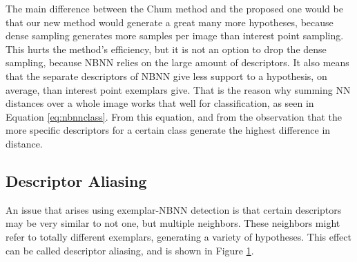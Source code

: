 The main difference between the Chum method and the proposed one would be that our new method would generate a great many more hypotheses, because dense sampling generates more samples per image than interest point sampling. This hurts the method's efficiency, but it is not an option to drop the dense sampling, because NBNN relies on the large amount of descriptors. It also means that the separate descriptors of NBNN give less support to a hypothesis, on average, than interest point exemplars give. That is the reason why summing NN distances over a whole image works that well for classification, as seen in Equation \eqref{eq:nbnnclass}. From this equation, and from the observation that the more specific descriptors for a certain class generate the highest difference in distance.





\subsection{Descriptor Aliasing} %
\label{sec:descriptor_aliasing}

An issue that arises using exemplar-NBNN detection is that certain descriptors may be very similar to not one, but multiple neighbors. These neighbors might refer to totally different exemplars, generating a variety of hypotheses. This effect can be called descriptor aliasing, and is shown in Figure \ref{fig:aliasing}.

\begin{figure}[hbt]
    \centering
    \label{fig:aliasing}
\end{figure}

